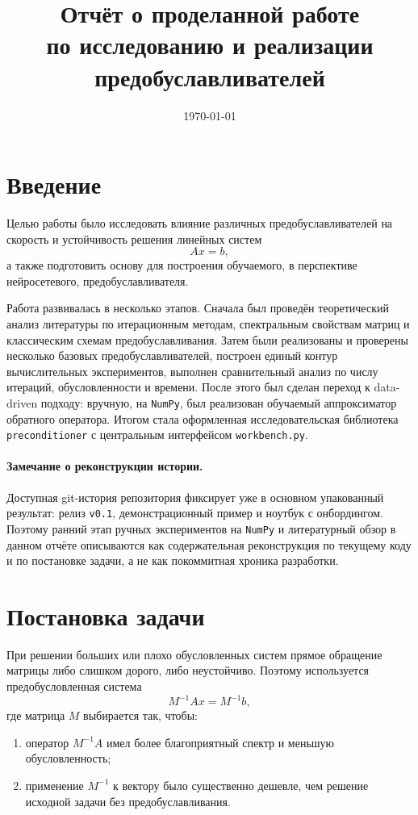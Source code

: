 \documentclass[12pt,a4paper]{article}
\title{Отчёт о проделанной работе\\
по исследованию и реализации предобуславливателей}
\author{}
\date{\today}
\begin{document}
\maketitle
\tableofcontents
\newpage

\section{Введение}

Целью работы было исследовать влияние различных предобуславливателей на скорость и устойчивость решения линейных систем
\[
Ax=b,
\]
а также подготовить основу для построения обучаемого, в перспективе нейросетевого, предобуславливателя.

Работа развивалась в несколько этапов. Сначала был проведён теоретический анализ литературы по итерационным методам, спектральным свойствам матриц и классическим схемам предобуславливания. Затем были реализованы и проверены несколько базовых предобуславливателей, построен единый контур вычислительных экспериментов, выполнен сравнительный анализ по числу итераций, обусловленности и времени. После этого был сделан переход к data-driven подходу: вручную, на \texttt{NumPy}, был реализован обучаемый аппроксиматор обратного оператора. Итогом стала оформленная исследовательская библиотека \texttt{preconditioner} с центральным интерфейсом \texttt{workbench.py}.

\paragraph{Замечание о реконструкции истории.}
Доступная git-история репозитория фиксирует уже в основном упакованный результат: релиз \texttt{v0.1}, демонстрационный пример и ноутбук с онбордингом. Поэтому ранний этап ручных экспериментов на \texttt{NumPy} и литературный обзор в данном отчёте описываются как содержательная реконструкция по текущему коду и по постановке задачи, а не как покоммитная хроника разработки.

\section{Постановка задачи}

При решении больших или плохо обусловленных систем прямое обращение матрицы либо слишком дорого, либо неустойчиво. Поэтому используется предобусловленная система
\[
M^{-1}Ax=M^{-1}b,
\]
где матрица $M$ выбирается так, чтобы:
\begin{enumerate}[label=\arabic*.]
    \item оператор $M^{-1}A$ имел более благоприятный спектр и меньшую обусловленность;
    \item применение $M^{-1}$ к вектору было существенно дешевле, чем решение исходной задачи без предобуславливания.
\end{enumerate}
\end{document}
